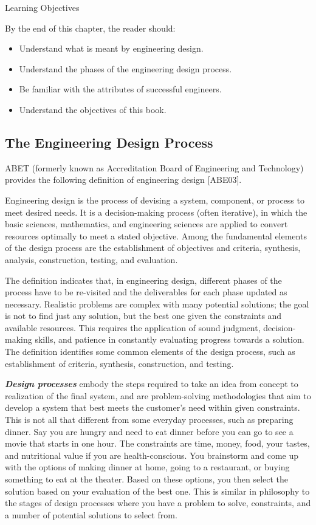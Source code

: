 Learning Objectives

By the end of this chapter, the reader should:

\begin{itemize}
\item
  Understand what is meant by engineering design.
\item
  Understand the phases of the engineering design process.
\item
  Be familiar with the attributes of successful engineers.
\item
  Understand the objectives of this book.
\end{itemize}

\subsection{The Engineering Design
Process}\label{the-engineering-design-process-1}

ABET (formerly known as Accreditation Board of Engineering and
Technology) provides the following definition of engineering design
{[}ABE03{]}.

Engineering design is the process of devising a system, component, or
process to meet desired needs. It is a decision-making process (often
iterative), in which the basic sciences, mathematics, and engineering
sciences are applied to convert resources optimally to meet a stated
objective. Among the fundamental elements of the design process are the
establishment of objectives and criteria, synthesis, analysis,
construction, testing, and evaluation.

The definition indicates that, in engineering design, different phases
of the process have to be re-visited and the deliverables for each phase
updated as necessary. Realistic problems are complex with many potential
solutions; the goal is not to find just any solution, but the best one
given the constraints and available resources. This requires the
application of sound judgment, decision-making skills, and patience in
constantly evaluating progress towards a solution. The definition
identifies some common elements of the design process, such as
establishment of criteria, synthesis, construction, and testing.

\emph{\textbf{Design processes}} embody the steps required to take an
idea from concept to realization of the final system, and are
problem-solving methodologies that aim to develop a system that best
meets the customer's need within given constraints. This is not all that
different from some everyday processes, such as preparing dinner. Say
you are hungry and need to eat dinner before you can go to see a movie
that starts in one hour. The constraints are time, money, food, your
tastes, and nutritional value if you are health-conscious. You
brainstorm and come up with the options of making dinner at home, going
to a restaurant, or buying something to eat at the theater. Based on
these options, you then select the solution based on your evaluation of
the best one. This is similar in philosophy to the stages of design
processes where you have a problem to solve, constraints, and a number
of potential solutions to select from.

